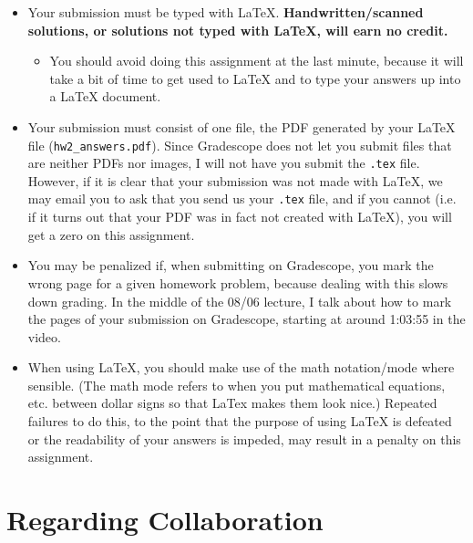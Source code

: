 \documentclass{article}
\begin{document}
\begin{itemize}[itemsep=0mm, parsep=0pt]
\item Your submission must be typed with LaTeX. \textbf{Handwritten/scanned solutions, or solutions not typed with LaTeX, will earn no credit.}
    \begin{itemize}[itemsep=0mm, parsep=0pt]
    \item You should avoid doing this assignment at the last minute, because it will take a bit of time to get used to LaTeX and to type your answers up into a LaTeX document.
    \end{itemize}
\item Your submission must consist of one file, the PDF generated by your LaTeX file (\lstinline{hw2_answers.pdf}). Since Gradescope does not let you submit files that are neither PDFs nor images, I will not have you submit the \lstinline{.tex} file. However, if it is clear that your submission was not made with LaTeX, we may email you to ask that you send us your \lstinline{.tex} file, and if you cannot (i.e. if it turns out that your PDF was in fact not created with LaTeX), you will get a zero on this assignment.
\item You may be penalized if, when submitting on Gradescope, you mark the wrong page for a given homework problem, because dealing with this slows down grading. In the middle of the 08/06 lecture, I talk about how to mark the pages of your submission on Gradescope, starting at around 1:03:55 in the video.
\item When using LaTeX, you should make use of the math notation/mode where sensible. (The math mode refers to when you put mathematical equations, etc. between dollar signs so that LaTex makes them look nice.) Repeated failures to do this, to the point that the purpose of using LaTeX is defeated or the readability of your answers is impeded, may result in a penalty on this assignment.
\end{itemize}

\section{Regarding Collaboration}
\end{document}
